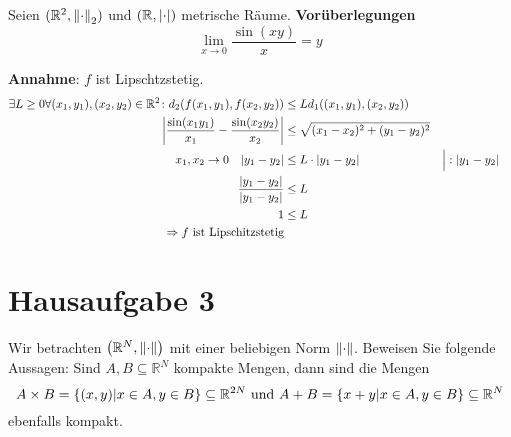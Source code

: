 \documentclass{scrreprt}
\begin{document}
Seien $(\mathbb{R}^2, \norm{\cdot}_2)$ und $(\mathbb{R}, \abs{\cdot})$
metrische Räume. \textbf{Vorüberlegungen}
\[
  \lim_{x \to 0} \frac{\sin(xy)}{x} = y
\]

\textbf{Annahme}: $f$ ist Lipschtzstetig.
\begin{align*}
  \exists L \geq 0 \forall (x_1, y_1), (x_2, y_2) \in \mathbb{R}^2 \colon d_2(f(x_1, y_1), f(x_2, y_2)) &\leq L d_1((x_1, y_1), (x_2, y_2)) \\
  \abs{\frac{\sin(x_1y_1)}{x_1} - \frac{\sin(x_2y_2)}{x_2}} &\leq\sqrt{(x_1 - x_2)^2 + (y_1 - y_2)^2} \\
x_1, x_2 \to 0 \quad  \abs{y_1 - y_2} &\leq L \cdot \abs{y_1 - y_2} && \Big| :\abs{y_1 - y_2} \\
  \frac{\abs{y_1 - y_2}}{\abs{y_1 - y_2}} &\leq L \\
  1 &\leq L \\
  \Rightarrow f \text{ ist Lipschitzstetig}
\end{align*}

\newpage
\section*{Hausaufgabe 3}

Wir betrachten $\qty(\mathbb{R}^N, \norm{\cdot})$ mit einer beliebigen Norm
$\norm{\cdot}$.
Beweisen Sie folgende Aussagen: Sind $A, B \subseteq \mathbb{R}^N$ kompakte
Mengen, dann sind die Mengen
\[
  A \times B = \qty{(x, y) \middle| x \in A, y \in B} \subseteq \mathbb{R}^{2N}
  \text{ und }
  A + B = \qty{x + y \middle| x \in A, y \in B} \subseteq \mathbb{R}^N
\]
ebenfalls kompakt.
\end{document}
